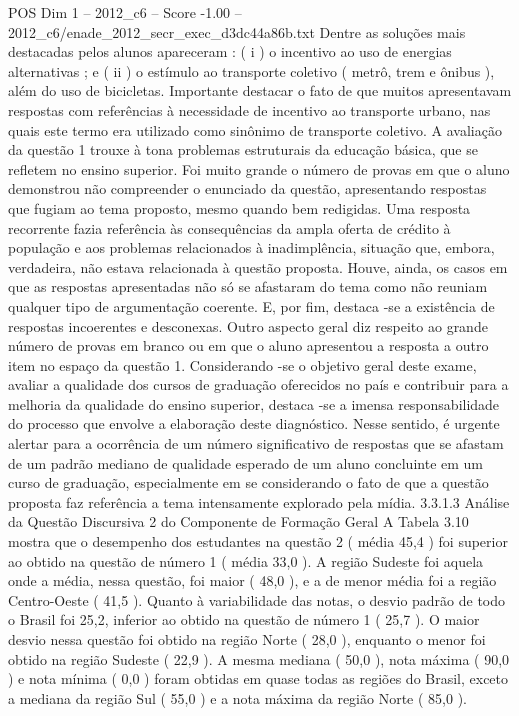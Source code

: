 \begin{textsample}{POS Dim 1 – 2012\_c6 – Score -1.00 – 2012\_c6/enade\_2012\_secr\_exec\_d3dc44a86b.txt}
Dentre as soluções mais destacadas pelos alunos apareceram : ( i ) o incentivo ao uso de energias alternativas ; e ( ii ) o estímulo ao transporte coletivo ( metrô, trem e ônibus ), além do uso de bicicletas.
Importante destacar o fato de que muitos apresentavam respostas com referências à necessidade de incentivo ao transporte urbano, nas quais este termo era utilizado como sinônimo de transporte coletivo.
A avaliação da questão 1 trouxe à tona problemas estruturais da educação básica, que se refletem no ensino superior.
Foi muito grande o número de provas em que o aluno demonstrou não compreender o enunciado da questão, apresentando respostas que fugiam ao tema proposto, mesmo quando bem redigidas.
Uma resposta recorrente fazia referência às consequências da ampla oferta de crédito à população e aos problemas relacionados à inadimplência, situação que, embora, verdadeira, não estava relacionada à questão proposta.
Houve, ainda, os casos em que as respostas apresentadas não só se afastaram do tema como não reuniam qualquer tipo de argumentação coerente.
E, por fim, destaca -se a existência de respostas incoerentes e desconexas.
Outro aspecto geral diz respeito ao grande número de provas em branco ou em que o aluno apresentou a resposta a outro item no espaço da questão 1.
Considerando -se o objetivo geral deste exame, avaliar a qualidade dos cursos de graduação oferecidos no país e contribuir para a melhoria da qualidade do ensino superior, destaca -se a imensa responsabilidade do processo que envolve a elaboração deste diagnóstico.
Nesse sentido, é urgente alertar para a ocorrência de um número significativo de respostas que se afastam de um padrão mediano de qualidade esperado de um aluno concluinte em um curso de graduação, especialmente em se considerando o fato de que a questão proposta faz referência a tema intensamente explorado pela mídia. 3.3.1.3 Análise da Questão Discursiva 2 do Componente de Formação Geral A Tabela 3.10 mostra que o desempenho dos estudantes na questão 2 ( média 45,4 ) foi superior ao obtido na questão de número 1 ( média 33,0 ).
A região Sudeste foi aquela onde a média, nessa questão, foi maior ( 48,0 ), e a de menor média foi a região Centro-Oeste ( 41,5 ).
Quanto à variabilidade das notas, o desvio padrão de todo o Brasil foi 25,2, inferior ao obtido na questão de número 1 ( 25,7 ).
O maior desvio nessa questão foi obtido na região Norte ( 28,0 ), enquanto o menor foi obtido na região Sudeste ( 22,9 ).
A mesma mediana ( 50,0 ), nota máxima ( 90,0 ) e nota mínima ( 0,0 ) foram obtidas em quase todas as regiões do Brasil, exceto a mediana da região Sul ( 55,0 ) e a nota máxima da região Norte ( 85,0 ).

\end{textsample}
